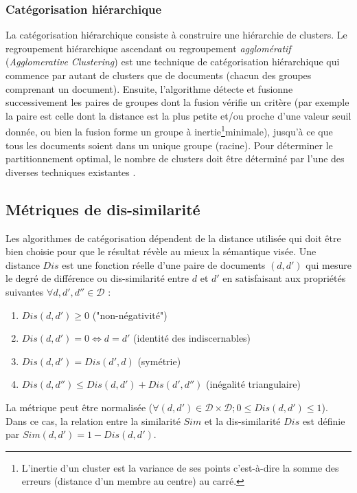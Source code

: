 \subsubsection{Catégorisation hiérarchique}
La catégorisation hiérarchique consiste à construire une hiérarchie de clusters. Le regroupement hiérarchique ascendant ou regroupement \textit{agglomératif} (\textit{Agglomerative Clustering}) est une technique de catégorisation hiérarchique qui commence par autant de clusters que de documents (chacun des groupes comprenant un document). Ensuite, l'algorithme détecte et fusionne successivement les paires de groupes dont la fusion vérifie un critère (par exemple la paire est celle dont la distance est la plus petite et/ou proche d'une valeur seuil donnée, ou bien la fusion forme un groupe à inertie\footnote{L'inertie d'un cluster est la variance de ses points c'est-à-dire la somme des erreurs (distance d'un membre au centre) au carré.}minimale),
jusqu'à ce que tous les documents soient dans un unique groupe (racine). Pour déterminer le partitionnement optimal, le nombre de clusters doit être déterminé par l'une des diverses techniques existantes \citep{thorndike1953HAC_nb_clusters, salvador2004Hierarchical_clustering_number_of_clusters}.

\subsection{Métriques de dis-similarité}
\label{sec:similarite:distances}
Les algorithmes de catégorisation dépendent de la distance utilisée qui doit être bien choisie pour que le résultat révèle au mieux la sémantique visée.
 Une distance $Dis$ est une fonction réelle d'une paire de documents $(d,d')$ qui mesure le degré de différence ou dis-similarité entre $d$ et $d'$  en satisfaisant aux propriétés suivantes $\forall d,d',d'' \in \mathcal{D}$ \citep{harispe2015semanticsimilarity,wang2015distancemetriclearningsurvey}:
\begin{enumerate}
\item $Dis(d,d') \geq 0$ ("non-négativité")
\item $Dis(d,d') = 0  \Leftrightarrow d = d'$ (identité des indiscernables)
\item $Dis(d,d') = Dis(d', d)$ (symétrie)
\item $Dis(d,d'') \leq Dis(d,d') + Dis(d',d'')$ (inégalité triangulaire) \label{enum:sim:ineq-tri}
\end{enumerate}


La métrique peut être normalisée ($\forall (d,d') \in \mathcal{D} \times \mathcal{D};  0 \leq Dis(d,d') \leq 1$). Dans ce cas, la relation entre la similarité $Sim$ et la dis-similarité $Dis$ est définie par $Sim(d,d') = 1 - Dis(d,d')$.

